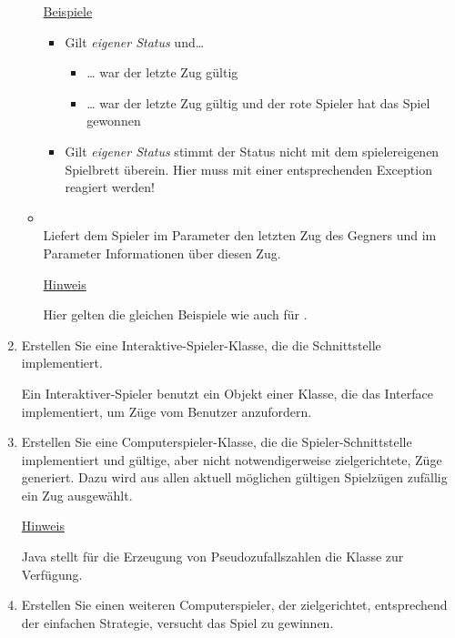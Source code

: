 \begin{enumerate}
\begin{itemize}[leftmargin=4em]
\underline{Beispiele}
\begin{itemize}
\item Gilt \textit{eigener Status} und\dots
\begin{itemize}
\item \dots {} war der letzte Zug gültig
\item \dots {} war der letzte Zug gültig und der rote Spieler hat das Spiel gewonnen
\end{itemize}
\item Gilt \textit{eigener Status} stimmt der Status nicht mit dem spielereigenen Spielbrett überein. Hier muss mit einer entsprechenden Exception reagiert werden!
\end{itemize}
\item[\code{update}] \hfill \\Liefert dem Spieler im Parameter  den letzten Zug des Gegners und im Parameter  Informationen über diesen Zug.

\underline{Hinweis}

Hier gelten die gleichen Beispiele wie auch für .
\end{itemize}

\item Erstellen Sie eine Interaktive-Spieler-Klasse, die die Schnittstelle \\  implementiert.

Ein Interaktiver-Spieler benutzt ein Objekt einer Klasse, die das Interface \\  implementiert, um Züge vom Benutzer anzufordern.

\item Erstellen Sie eine Computerspieler-Klasse, die die Spieler-Schnittstelle implementiert und gültige, aber nicht notwendigerweise zielgerichtete, Züge generiert. Dazu wird aus allen aktuell möglichen gültigen Spielzügen zufällig ein Zug ausgewählt.

\underline{Hinweis}

Java stellt für die Erzeugung von Pseudozufallszahlen die Klasse  zur Verfügung.

\item Erstellen Sie einen weiteren Computerspieler, der zielgerichtet, entsprechend der einfachen Strategie, versucht das Spiel zu gewinnen.


\end{enumerate}
